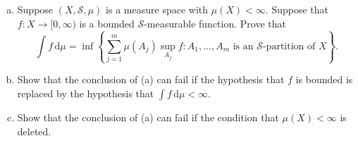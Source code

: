 \documentclass[10pt]{article}
\newcommand{\dd}{\,\mathrm{d}}
\providecommand{\ii}{\item}
\begin{document}
\begin{problem}
    [Axler 3B \#4]
    \begin{enumerate}[(a)]
	\ii Suppose $(X,\mathcal S,\mu)$ is a measure space with $\mu(X) < \infty$.
	Suppose that $f\colon X\to[0,\infty)$ is
	a bounded $\mathcal S$-measurable function. Prove that
	\begin{equation*}
	    \int f\dd\mu = \inf\left\{ \sum_{j=1}^m \mu(A_j)\sup_{A_j}f :
	    A_1,\dots,A_m\text{ is an $\mathcal S$-partition of $X$}\right\}.
	\end{equation*}
	\ii Show that the conclusion of (a) can fail if
	the hypothesis that $f$ is bounded is replaced by
	the hypothesis that $\int f\dd\mu < \infty$.
	\ii Show that the conclusion of (a) can fail if
	the condition that $\mu(X) < \infty$ is deleted.
\end{enumerate}
\end{problem}
\end{document}
